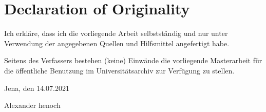 \chapter*{Declaration of Originality}

Ich erkläre, dass ich die vorliegende Arbeit selbstständig und nur unter Verwendung der angegebenen Quellen und Hilfsmittel angefertigt habe.

\vspace{1em}

Seitens des Verfassers bestehen (keine) Einwände die vorliegende Masterarbeit für die öffentliche Benutzung im Universitätsarchiv zur Verfügung zu stellen.

\vspace{6em}

Jena, den 14.07.2021\hspace*{0.35\textwidth}\hrulefill

\phantom{Jena, den 14.07.2021}\hspace*{0.35\textwidth}Alexander henoch
